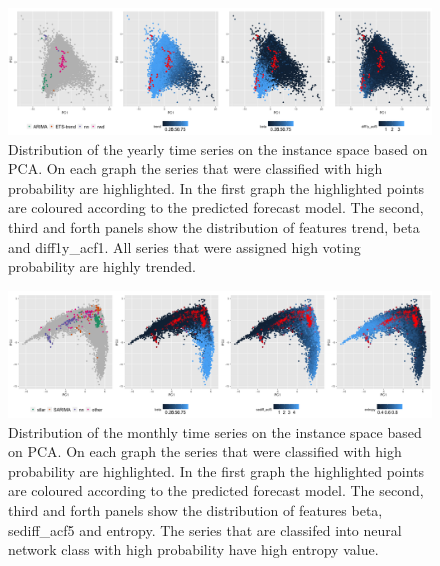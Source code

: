 \documentclass[11pt,a4paper,]{article}
\begin{document}
\begin{figure}[H]

{\centering \includegraphics[width=\textwidth]{figure/pcayearly-1} 

}

\caption{Distribution of the yearly time series on the instance space based on PCA. On each graph the series that were classified with high probability are highlighted. In the first graph the highlighted points are coloured according to the predicted forecast model. The second, third and forth panels show the distribution of features trend, beta and diff1y\_acf1.  All series that were assigned high voting probability are highly trended.}\label{fig:pcayearly}
\end{figure}

\begin{figure}[H]

{\centering \includegraphics[width=\textwidth]{figure/pcamonthly-1} 

}

\caption{Distribution of the monthly time series on the instance space based on PCA. On each graph the series that were classified with high probability are highlighted. In the first graph the highlighted points are coloured according to the predicted forecast model. The second, third and forth panels show the distribution of features beta, sediff\_acf5 and entropy.  The series that are classifed into neural network class with high probability have high entropy value.}\label{fig:pcamonthly}
\end{figure}
\end{document}
